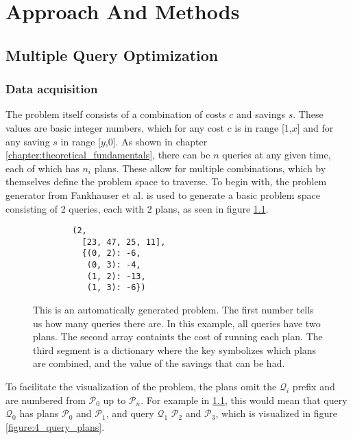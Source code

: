 \chapter{Approach And Methods} %

\label{chapter:approach_and_methods} %

\newcommand{\rygate}{$\mathrm{R_Y}$}
\section{Multiple Query Optimization}

\subsection{Data acquisition}
\label{chapter:mqp_data_acquisition}

The problem itself consists of a combination of costs $c$ and savings $s$. These values are basic integer numbers, which for any cost $c$ is in range [1,$x$] and for any saving $s$ in range [$y$,0]. As shown in chapter \ref{chapter:theoretical_fundamentals}, there can be $n$ queries at any given time, each of which has $n_i$ plans. These allow for multiple combinations, which by themselves define the problem space to traverse. To begin with, the problem generator from Fankhauser et al.\cite{fankhauser_multiple_2021} is used to generate a basic problem space consisting of 2 queries, each with 2 plans, as seen in figure \ref{figure:2d_problem_data}.

\begin{figure}[!h]
    \centering
    \begin{verbatim}
        (2,
          [23, 47, 25, 11],
          {(0, 2): -6,
           (0, 3): -4,
           (1, 2): -13,
           (1, 3): -6})
    \end{verbatim}
    \caption{This is an automatically generated problem. The first number tells us how many queries there are. In this example, all queries have two plans. The second array containts the cost of running each plan. The third segment is a dictionary where the key symbolizes which plans are combined, and the value of the savings that can be had.}
    \label{figure:2d_problem_data}
\end{figure}

To facilitate the visualization of the problem, the plans omit the $\mathcal{Q}_i$ prefix and are numbered from $\mathcal{P}_0$ up to $\mathcal{P}_n$. For example in \ref{figure:2d_problem_data}, this would mean that query $\mathcal{Q}_0$ has plans $\mathcal{P}_0$ and $\mathcal{P}_1$, and query $\mathcal{Q}_1$ $\mathcal{P}_2$ and $\mathcal{P}_3$, which is visualized in figure \ref{figure:4_query_plans}.

